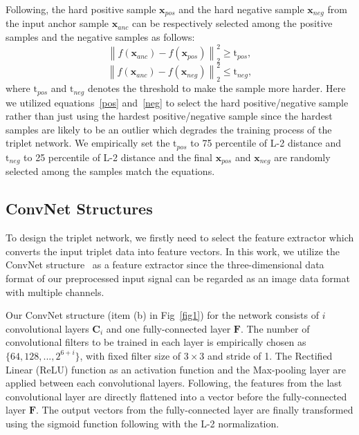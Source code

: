 \documentclass[runningheads]{llncs}
\begin{document}
Following, the hard positive sample $\mathbf{x}_{pos}$ and the hard negative sample $\mathbf{x}_{neg}$ from the input anchor sample $\mathbf{x}_{anc}$ can be respectively selected among the positive samples and the negative samples as follows:
\begin{equation}
    {\left\| {{f\left(\mathbf{x}_{anc}\right)} - {f\left(\mathbf{x}_{pos}\right)}} \right\|_2^2} \geq \mathrm{t}_{pos}, \label{pos}
\end{equation}
\begin{equation}
    {\left\| {{f\left(\mathbf{x}_{anc}\right)} - {f\left(\mathbf{x}_{neg}\right)}} \right\|_2^2} \leq \mathrm{t}_{neg},\label{neg}
\end{equation}
where $\mathrm{t}_{pos}$ and $\mathrm{t}_{neg}$ denotes the threshold to make the sample more harder. Here we utilized equations~\eqref{pos} and~\eqref{neg} to select the hard positive/negative sample rather than just using the hardest positive/negative sample since the hardest samples are likely to be an outlier which degrades the training process of the triplet network.
We empirically set the $\mathrm{t}_{pos}$ to 75 percentile of L-2 distance and $\mathrm{t}_{neg}$ to 25 percentile of L-2 distance and the final $\mathbf{x}_{pos}$ and $\mathbf{x}_{neg}$ are randomly selected among the samples match the equations.

\subsection{ConvNet Structures}

To design the triplet network, we firstly need to select the feature extractor which converts the input triplet data into feature vectors. In this work, we utilize the ConvNet structure~\cite{lecun1998gradient} as a feature extractor since the three-dimensional data format of our preprocessed input signal can be regarded as an image data format with multiple channels. 

Our ConvNet structure (item (b) in Fig~\ref{fig1}) for the network consists of $i$ convolutional layers $\mathbf{C}_{i}$ and one fully-connected layer $\mathbf{F}$. The number of convolutional filters to be trained in each layer is empirically chosen as $\{64, 128, ...,  2^{6+i}\}$, with fixed filter size of $3\times3$ and stride of 1. The Rectiﬁed Linear (ReLU) function as an activation function and the Max-pooling layer are applied between each convolutional layers. Following, the features from the last convolutional layer are directly flattened into a vector before the fully-connected layer $\mathbf{F}$.
The output vectors from the fully-connected layer are finally transformed using the sigmoid function following with the L-2 normalization.
\end{document}
